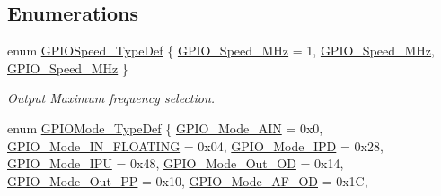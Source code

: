 \subsection*{Enumerations}
\begin{DoxyCompactItemize}
\item 
enum \mbox{\hyperlink{group___g_p_i_o___exported___types_ga062ad92b67b4a1f301c161022cf3ba8e}{G\+P\+I\+O\+Speed\+\_\+\+Type\+Def}} \{ \mbox{\hyperlink{group___g_p_i_o___exported___types_gga062ad92b67b4a1f301c161022cf3ba8ea8c567e4b0186e3708cd7020c13da6439}{G\+P\+I\+O\+\_\+\+Speed\+\_\+M\+Hz}} = 1, 
\mbox{\hyperlink{group___g_p_i_o___exported___types_gga062ad92b67b4a1f301c161022cf3ba8ea9bff9e174639332007c914483361be18}{G\+P\+I\+O\+\_\+\+Speed\+\_\+M\+Hz}}, 
\mbox{\hyperlink{group___g_p_i_o___exported___types_gga062ad92b67b4a1f301c161022cf3ba8ea9c47db10456202ac05134b12738ce581}{G\+P\+I\+O\+\_\+\+Speed\+\_\+M\+Hz}}
 \}
\begin{DoxyCompactList}\small\item\em Output Maximum frequency selection. \end{DoxyCompactList}\item 
enum \mbox{\hyperlink{group___g_p_i_o___exported___types_ga1347339e1c84a196fabbb31205eec5d4}{G\+P\+I\+O\+Mode\+\_\+\+Type\+Def}} \{ \newline
\mbox{\hyperlink{group___g_p_i_o___exported___types_gga1347339e1c84a196fabbb31205eec5d4a3b9a166bf59b96c68c5c0c59811b80fc}{G\+P\+I\+O\+\_\+\+Mode\+\_\+\+A\+IN}} = 0x0, 
\mbox{\hyperlink{group___g_p_i_o___exported___types_gga1347339e1c84a196fabbb31205eec5d4a0e3d2ce89b42f093d327a5e42e4d7cc2}{G\+P\+I\+O\+\_\+\+Mode\+\_\+\+I\+N\+\_\+\+F\+L\+O\+A\+T\+I\+NG}} = 0x04, 
\mbox{\hyperlink{group___g_p_i_o___exported___types_gga1347339e1c84a196fabbb31205eec5d4ad5b7c382c280d0b14786aa7e0af783dc}{G\+P\+I\+O\+\_\+\+Mode\+\_\+\+I\+PD}} = 0x28, 
\mbox{\hyperlink{group___g_p_i_o___exported___types_gga1347339e1c84a196fabbb31205eec5d4adc5187fa416ea708ee4cb445ef2c59e7}{G\+P\+I\+O\+\_\+\+Mode\+\_\+\+I\+PU}} = 0x48, 
\newline
\mbox{\hyperlink{group___g_p_i_o___exported___types_gga1347339e1c84a196fabbb31205eec5d4a629b05b1e9adee098eaf648b044dde0b}{G\+P\+I\+O\+\_\+\+Mode\+\_\+\+Out\+\_\+\+OD}} = 0x14, 
\mbox{\hyperlink{group___g_p_i_o___exported___types_gga1347339e1c84a196fabbb31205eec5d4a0eee8242abb8f2f8a97bbdf0f1dc59b2}{G\+P\+I\+O\+\_\+\+Mode\+\_\+\+Out\+\_\+\+PP}} = 0x10, 
\mbox{\hyperlink{group___g_p_i_o___exported___types_gga1347339e1c84a196fabbb31205eec5d4ac34bf80d30de7b34444c9cbdb20695b5}{G\+P\+I\+O\+\_\+\+Mode\+\_\+\+A\+F\+\_\+\+OD}} = 0x1C, 

\end{DoxyCompactItemize}

